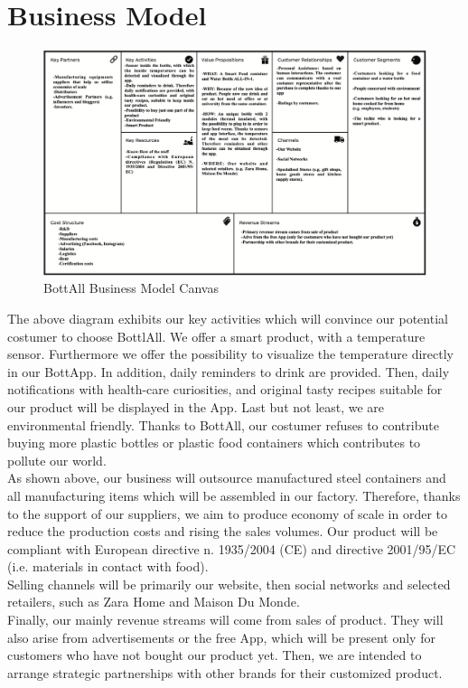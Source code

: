 \section{Business Model}
\begin{figure}[H]
\centering
\includegraphics[width=1\textwidth]{images/BMC.png}
\caption{BottAll Business Model Canvas}
\end{figure}
The above diagram exhibits our key activities which will convince our potential costumer to choose BottlAll. We offer a smart product, with a temperature sensor. Furthermore we offer the possibility to visualize the temperature directly in our BottApp. In addition, daily reminders to drink are provided. Then, daily notifications with health-care curiosities, and original tasty recipes suitable for our product will be displayed in the App. Last but not least, we are environmental friendly. Thanks to BottAll, our costumer refuses to contribute buying more plastic bottles or plastic food containers which contributes to pollute our world.\\
As shown above, our business will outsource manufactured steel containers and all manufacturing items which will be assembled in our factory. Therefore, thanks to the support of our suppliers, we aim to produce economy of scale in order to reduce the production costs and rising the sales volumes. Our product will be compliant with European directive n. 1935/2004 (CE) and directive 2001/95/EC (i.e. materials in contact with food).\\
Selling channels will be primarily our website, then social networks and selected retailers, such as Zara Home and Maison Du Monde.\\
Finally, our mainly revenue streams will come from sales of product. They will also arise from advertisements or the free App, which will be present only for customers who have not bought our product yet. Then, we are intended to arrange strategic partnerships with other brands for their customized product. 